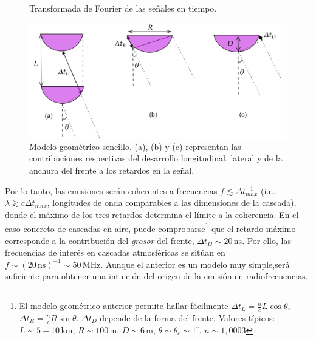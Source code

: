 \documentclass[12 pt, a4paper]{article} %
\numberwithin{equation}{section}
\numberwithin{figure}{section}
\numberwithin{table}{section}
\begin{document}
\begin{figure}[H]
	\centering
	\caption{Transformada de Fourier de las señales en tiempo.}
	\label{E_fields_FFT}
\end{figure}
\begin{figure}[H]
	\centering
	\includegraphics[width=.7\linewidth]{figures/radio/coherence_v2}
	\caption{Modelo geométrico sencillo. (a), (b) y (c) representan las contribuciones respectivas del desarrollo longitudinal, lateral y de la anchura del frente a los retardos en la señal.}
	\label{coherence}
\end{figure}

Por lo tanto, las emisiones serán coherentes a frecuencias $f\lesssim\Delta t_{max}^{-1}$ (i.e., $\lambda\gtrsim c\Delta t_{max}$, longitudes de onda comparables a las dimensiones de la cascada), donde el máximo de los tres retardos determina el límite a la coherencia. En el caso concreto de cascadas en aire, puede comprobarse\footnote{El modelo geométrico anterior permite hallar fácilmente $\Delta t_{L}=\frac{n}{c}L\cos{\theta}$, $\Delta t_{R}=\frac{n}{c}R\sin{\theta}$. $\Delta t_D$ depende de la forma del frente. Valores típicos: $L\sim 5-10\,\mathrm{km}$, $R\sim100\,\mathrm{m}$, $D\sim6\,\mathrm{m}$, $\theta\sim\theta_c\sim1^\circ$, $n\sim1,0003$} que el retardo máximo corresponde a la contribución del \textit{grosor} del frente, $\Delta t_D\sim 20\,\mathrm{ns}$. Por ello, las frecuencias de interés en cascadas atmosféricas se sitúan en $f\sim\left(20\,\mathrm{ns}\right)^{-1}\sim50\,\mathrm{MHz}$. Aunque el anterior es un modelo muy simple,será suficiente para obtener una intuición del origen de la emisión en radiofrecuencias.
\end{document}
